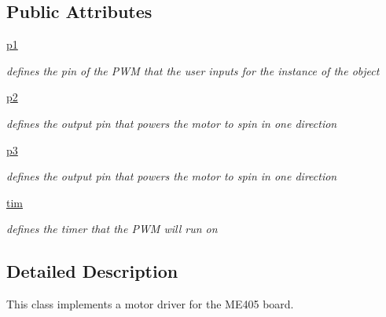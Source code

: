 \subsection*{Public Attributes}
\begin{DoxyCompactItemize}
\item 
\mbox{\label{classmotordriver_1_1MotorDriver_a3ea5dc48dedc82b9e6499d91038bdcfe}} 
\mbox{\hyperlink{classmotordriver_1_1MotorDriver_a3ea5dc48dedc82b9e6499d91038bdcfe}{p1}}
\begin{DoxyCompactList}\small\item\em defines the pin of the P\+WM that the user inputs for the instance of the object \end{DoxyCompactList}\item 
\mbox{\label{classmotordriver_1_1MotorDriver_a9a61d26708f2a7a1c2d3fd19a3db2cc2}} 
\mbox{\hyperlink{classmotordriver_1_1MotorDriver_a9a61d26708f2a7a1c2d3fd19a3db2cc2}{p2}}
\begin{DoxyCompactList}\small\item\em defines the output pin that powers the motor to spin in one direction \end{DoxyCompactList}\item 
\mbox{\label{classmotordriver_1_1MotorDriver_a8940e3b4d7c66c4e73a5db89cd5b6440}} 
\mbox{\hyperlink{classmotordriver_1_1MotorDriver_a8940e3b4d7c66c4e73a5db89cd5b6440}{p3}}
\begin{DoxyCompactList}\small\item\em defines the output pin that powers the motor to spin in one direction \end{DoxyCompactList}\item 
\mbox{\label{classmotordriver_1_1MotorDriver_afaa5d2ef405f0223461d31e354ecfb7f}} 
\mbox{\hyperlink{classmotordriver_1_1MotorDriver_afaa5d2ef405f0223461d31e354ecfb7f}{tim}}
\begin{DoxyCompactList}\small\item\em defines the timer that the P\+WM will run on \end{DoxyCompactList}\end{DoxyCompactItemize}


\subsection{Detailed Description}
This class implements a motor driver for the M\+E405 board. 

